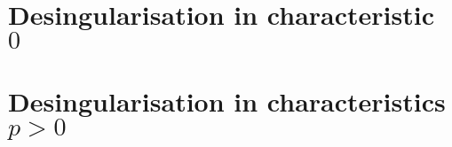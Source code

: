 \section{Desingularisation in characteristic \texorpdfstring{$0$}{}}

\section{Desingularisation in characteristics \texorpdfstring{$p > 0$}{}}
